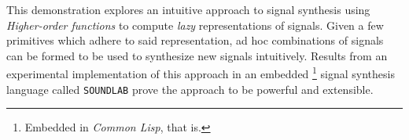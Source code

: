 This demonstration explores an intuitive approach to signal synthesis
using \textit{Higher-order functions} to compute \textit{lazy}
representations of signals. Given a few primitives which adhere to said
representation, ad hoc combinations of signals can be formed to be used
to synthesize new signals intuitively. Results from an experimental
implementation of this approach in an embedded \footnote{Embedded in
\textit{Common Lisp}, that is.} signal synthesis language called
\texttt{SOUNDLAB} prove the approach to be powerful and extensible.

